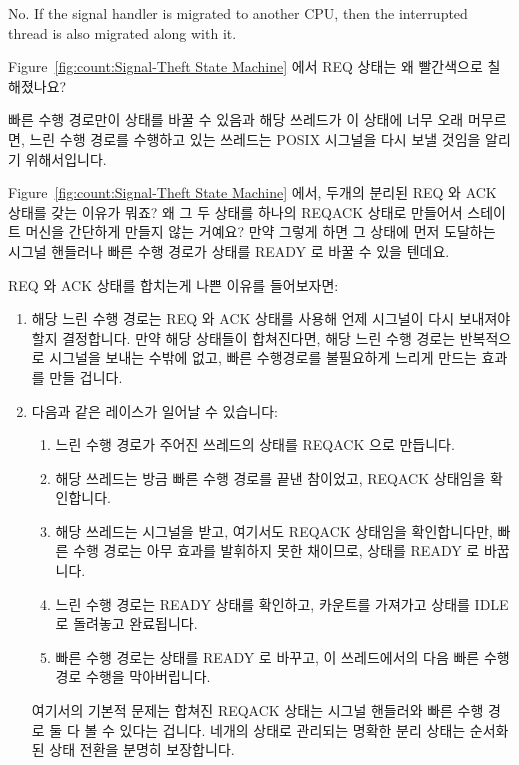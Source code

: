 \begin{enumerate}
	No.
	If the signal handler is migrated to another CPU, then the
	interrupted thread is also migrated along with it.
	\fi

\QuickQ{}
	Figure~\ref{fig:count:Signal-Theft State Machine} 에서 REQ 
	상태는 왜 빨간색으로 칠해졌나요?

\QuickA{}
	빠른 수행 경로만이  상태를 바꿀 수 있음과 해당 쓰레드가 이
	상태에 너무 오래 머무르면, 느린 수행 경로를 수행하고 있는 쓰레드는
	POSIX 시그널을 다시 보낼 것임을 알리기 위해서입니다.

\QuickQ{}
	Figure~\ref{fig:count:Signal-Theft State Machine} 에서, 두개의 분리된
	REQ 와 ACK  상태를 갖는 이유가 뭐죠?
	왜 그 두 상태를 하나의 REQACK 상태로 만들어서 스테이트 머신을 간단하게
	만들지 않는 거예요?
	만약 그렇게 하면 그 상태에 먼저 도달하는 시그널 핸들러나 빠른 수행
	경로가 상태를 READY 로 바꿀 수 있을 텐데요.

\QuickA{}
	REQ 와 ACK 상태를 합치는게 나쁜 이유를 들어보자면:
	\begin{enumerate}
	\item	해당 느린 수행 경로는 REQ 와 ACK 상태를 사용해 언제 시그널이
		다시 보내져야 할지 결정합니다.
		만약 해당 상태들이 합쳐진다면, 해당 느린 수행 경로는 반복적으로
		시그널을 보내는 수밖에 없고, 빠른 수행경로를 불필요하게 느리게
		만드는 효과를 만들 겁니다.
	\item	다음과 같은 레이스가 일어날 수 있습니다:
		\begin{enumerate}
		\item	느린 수행 경로가 주어진 쓰레드의 상태를 REQACK 으로
			만듭니다.
		\item	해당 쓰레드는 방금 빠른 수행 경로를 끝낸 참이었고,
			REQACK 상태임을 확인합니다.
		\item	해당 쓰레드는 시그널을 받고, 여기서도 REQACK 상태임을
			확인합니다만, 빠른 수행 경로는 아무 효과를 발휘하지
			못한 채이므로, 상태를 READY 로 바꿉니다.
		\item	느린 수행 경로는 READY 상태를 확인하고, 카운트를
			가져가고 상태를 IDLE 로 돌려놓고 완료됩니다.
		\item	빠른 수행 경로는 상태를 READY 로 바꾸고, 이
			쓰레드에서의 다음 빠른 수행 경로 수행을 막아버립니다.
		\end{enumerate}
		여기서의 기본적 문제는 합쳐진 REQACK 상태는 시그널 핸들러와
		빠른 수행 경로 둘 다 볼 수 있다는 겁니다.
		네개의 상태로 관리되는 명확한 분리 상태는 순서화된 상태 전환을
		분명히 보장합니다.
	\end{enumerate}
	\iffalse


\end{enumerate}
